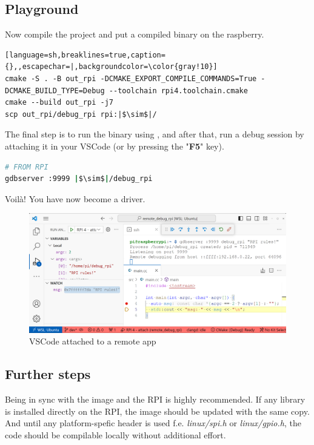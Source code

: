 \documentclass[twocolumn, 10pt]{article}
\begin{document}
\subsection*{Playground}
Now compile the project and put a compiled binary on the raspberry.
\begin{lstlisting}[language=sh,breaklines=true,caption={},,escapechar=|,backgroundcolor=\color{gray!10}]
cmake -S . -B out_rpi -DCMAKE_EXPORT_COMPILE_COMMANDS=True -DCMAKE_BUILD_TYPE=Debug --toolchain rpi4.toolchain.cmake
cmake --build out_rpi -j7
scp out_rpi/debug_rpi rpi:|$\sim$|/
\end{lstlisting}

The final step is to run the binary using , and after that, run a debug session by attaching it in your VSCode (or by pressing the "\textbf{F5}" key).
\begin{lstlisting}[language=sh,breaklines=true,caption={},escapechar=|,backgroundcolor=\color{gray!10}]
# FROM RPI
gdbserver :9999 |$\sim$|/debug_rpi
\end{lstlisting}
Voilà! You have now become a driver.

\begin{figure}
  \includegraphics[width=\linewidth]{res/remote_debug_rpi_light.png}
  \caption*{VSCode attached to a remote app}
  \label{fig:debug}
\end{figure}

\subsection*{Further steps}
Being in sync with the image and the RPI is highly recommended.
  If any library is installed directly on the RPI, the image
  should be updated with the same copy. And until any platform-spefic header is used
  f.e. \mbox{\textit{linux/spi.h}} or \mbox{\textit{linux/gpio.h}}, the code should be compilable
  locally without additional effort.
\end{document}
